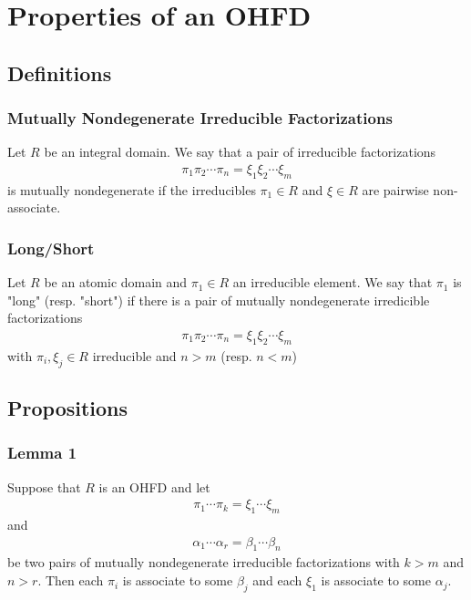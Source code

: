 \section{Properties of an OHFD}

\subsection{Definitions}

\begin{frame}
  \frametitle{Mutually Nondegenerate Irreducible Factorizations}
  \begin{definition}
    Let $R$ be an integral domain. We say that a pair of irreducible factorizations
    \begin{align*}
      \pi_1\pi_2\cdots\pi_n = \xi_1\xi_2\cdots\xi_m
    \end{align*}
    is mutually nondegenerate if the irreducibles $\pi_1 \in R$ and $\xi \in R$ are pairwise non-associate.
  \end{definition}
\end{frame}

\begin{frame}
  \frametitle{Long/Short}
  \begin{definition}
    Let $R$ be an atomic domain and $\pi_1 \in R$ an irreducible element.
    We say that $\pi_1$ is "long" (resp. "short") if there is a pair of mutually nondegenerate irredicible factorizations
    \begin{align*}
      \pi_1\pi_2\cdots\pi_n = \xi_1\xi_2\cdots \xi_m
    \end{align*}
    with $\pi_i, \xi_j \in R$ irreducible and $n > m$ (resp. $n<m$)
  \end{definition}
\end{frame}

\subsection{Propositions}

\begin{frame}
  \frametitle{Lemma 1}
  \begin{lemma}
    Suppose that $R$ is an OHFD and let
    \begin{align*}
      \pi_1\cdots\pi_k=\xi_1\cdots\xi_m
    \end{align*}
    and
    \begin{align*}
      \alpha_1\cdots\alpha_r=\beta_1\cdots\beta_n
    \end{align*}
    be two pairs of mutually nondegenerate irreducible factorizations with $k>m$ and $n>r$.
    Then each $\pi_i$ is associate to some $\beta_j$ and each $\xi_1$ is associate to some $\alpha_j$. 
  \end{lemma}
\end{frame}

